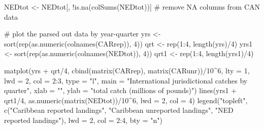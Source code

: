 \documentclass[
  letterpaper,
  oneside,
  open=any]{scrbook}
\newenvironment{Shaded}{\begin{snugshade}}{\end{snugshade}}
\newcommand{\AttributeTok}[1]{\textcolor[rgb]{0.40,0.45,0.13}{#1}}
\newcommand{\CommentTok}[1]{\textcolor[rgb]{0.37,0.37,0.37}{#1}}
\newcommand{\DecValTok}[1]{\textcolor[rgb]{0.68,0.00,0.00}{#1}}
\newcommand{\FunctionTok}[1]{\textcolor[rgb]{0.28,0.35,0.67}{#1}}
\newcommand{\NormalTok}[1]{\textcolor[rgb]{0.00,0.23,0.31}{#1}}
\newcommand{\OtherTok}[1]{\textcolor[rgb]{0.00,0.23,0.31}{#1}}
\newcommand{\SpecialCharTok}[1]{\textcolor[rgb]{0.37,0.37,0.37}{#1}}
\newcommand{\StringTok}[1]{\textcolor[rgb]{0.13,0.47,0.30}{#1}}
\begin{document}
\begin{Shaded}
\begin{Highlighting}[]
\NormalTok{NEDtot }\OtherTok{\textless{}{-}}\NormalTok{ NEDtot[, }\SpecialCharTok{!}\FunctionTok{is.na}\NormalTok{(}\FunctionTok{colSums}\NormalTok{(NEDtot))] }\CommentTok{\# remove NA columns from CAN data}

\CommentTok{\# plot the parsed out data by year{-}quarter}
\NormalTok{yrs }\OtherTok{\textless{}{-}} \FunctionTok{sort}\NormalTok{(}\FunctionTok{rep}\NormalTok{(}\FunctionTok{as.numeric}\NormalTok{(}\FunctionTok{colnames}\NormalTok{(CARrep)), }\DecValTok{4}\NormalTok{))}
\NormalTok{qrt }\OtherTok{\textless{}{-}} \FunctionTok{rep}\NormalTok{(}\DecValTok{1}\SpecialCharTok{:}\DecValTok{4}\NormalTok{, }\FunctionTok{length}\NormalTok{(yrs)}\SpecialCharTok{/}\DecValTok{4}\NormalTok{)}
\NormalTok{yrs1 }\OtherTok{\textless{}{-}} \FunctionTok{sort}\NormalTok{(}\FunctionTok{rep}\NormalTok{(}\FunctionTok{as.numeric}\NormalTok{(}\FunctionTok{colnames}\NormalTok{(NEDtot)), }\DecValTok{4}\NormalTok{))}
\NormalTok{qrt1 }\OtherTok{\textless{}{-}} \FunctionTok{rep}\NormalTok{(}\DecValTok{1}\SpecialCharTok{:}\DecValTok{4}\NormalTok{, }\FunctionTok{length}\NormalTok{(yrs1)}\SpecialCharTok{/}\DecValTok{4}\NormalTok{)}

\FunctionTok{matplot}\NormalTok{(yrs }\SpecialCharTok{+}\NormalTok{ qrt}\SpecialCharTok{/}\DecValTok{4}\NormalTok{, }\FunctionTok{cbind}\NormalTok{(}\FunctionTok{matrix}\NormalTok{(CARrep), }\FunctionTok{matrix}\NormalTok{(CARunr))}\SpecialCharTok{/}\DecValTok{10}\SpecialCharTok{\^{}}\DecValTok{6}\NormalTok{, }\AttributeTok{lty =} \DecValTok{1}\NormalTok{, }\AttributeTok{lwd =} \DecValTok{2}\NormalTok{, }
        \AttributeTok{col =} \DecValTok{2}\SpecialCharTok{:}\DecValTok{3}\NormalTok{, }\AttributeTok{type =} \StringTok{"l"}\NormalTok{, }\AttributeTok{main =} \StringTok{"International jurisdictional catches by quarter"}\NormalTok{, }
        \AttributeTok{xlab =} \StringTok{""}\NormalTok{, }\AttributeTok{ylab =} \StringTok{"total catch (millions of pounds)"}\NormalTok{)}
\FunctionTok{lines}\NormalTok{(yrs1 }\SpecialCharTok{+}\NormalTok{ qrt1}\SpecialCharTok{/}\DecValTok{4}\NormalTok{, }\FunctionTok{as.numeric}\NormalTok{(}\FunctionTok{matrix}\NormalTok{(NEDtot))}\SpecialCharTok{/}\DecValTok{10}\SpecialCharTok{\^{}}\DecValTok{6}\NormalTok{, }\AttributeTok{lwd =} \DecValTok{2}\NormalTok{, }\AttributeTok{col =} \DecValTok{4}\NormalTok{)}
\FunctionTok{legend}\NormalTok{(}\StringTok{"topleft"}\NormalTok{, }\FunctionTok{c}\NormalTok{(}\StringTok{"Caribbean reported landings"}\NormalTok{, }\StringTok{"Caribbean unreported landings"}\NormalTok{, }\StringTok{"NED reported landings"}\NormalTok{),        }
       \AttributeTok{lwd =} \DecValTok{2}\NormalTok{, }\AttributeTok{col =} \DecValTok{2}\SpecialCharTok{:}\DecValTok{4}\NormalTok{, }\AttributeTok{bty =} \StringTok{"n"}\NormalTok{)}
\end{Highlighting}
\end{Shaded}
\end{document}
